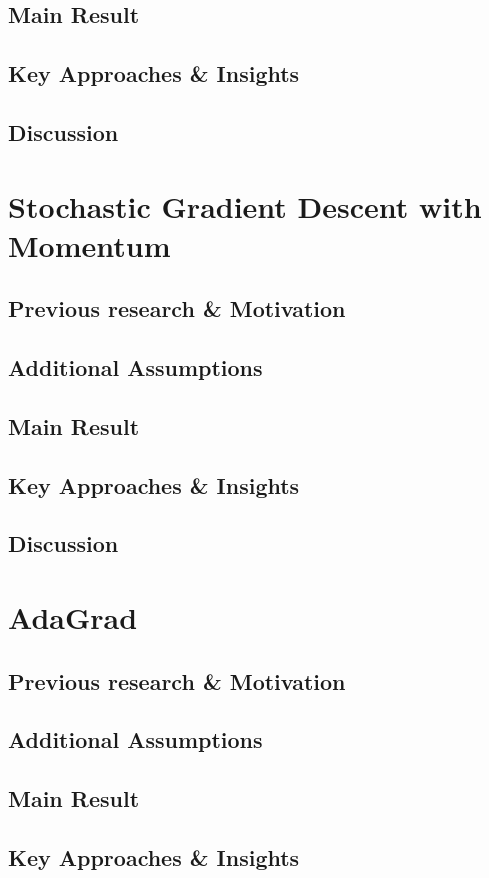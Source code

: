 \documentclass{article}
\begin{document}
\subsection{Main Result}
\subsection{Key Approaches \& Insights}
\subsection{Discussion}
\newpage
\section{Stochastic Gradient Descent with Momentum}
\subsection{Previous research \& Motivation}
\subsection{Additional Assumptions}
\subsection{Main Result}
\subsection{Key Approaches \& Insights}
\subsection{Discussion}
\newpage
\section{AdaGrad}
\subsection{Previous research \& Motivation}
\subsection{Additional Assumptions}
\subsection{Main Result}
\subsection{Key Approaches \& Insights}
\end{document}

